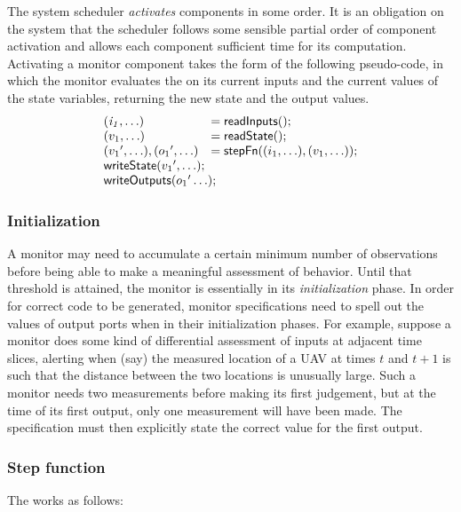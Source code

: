 The system scheduler \emph{activates} components in some order. It is
an obligation on the system that the scheduler follows some sensible
partial order of component activation and allows each component
sufficient time for its computation.  Activating a monitor component
takes the form of the following pseudo-code, in which the monitor
evaluates the  on its current inputs and the current
values of the state variables, returning the new state and the output
values.
\[
\begin{array}{ll}
 \mathit{(i_1,\ldots)} & = \konst{readInputs}(); \\
 (v_1,\ldots) & = \konst{readState}() ; \\
 ({v_1}',\ldots), ({o_1}',\ldots) & = \konst{stepFn} ((i_1,\ldots),(v_1,\ldots)) ; \\
 \multicolumn{2}{l}{\konst{writeState}({v_1}',\ldots);} \\
 \multicolumn{2}{l}{\konst{writeOutputs}({o_1}'\ldots);} \\
\end{array}
\]

\subsubsection{Initialization}

A monitor may need to accumulate a certain minimum number of
observations before being able to make a meaningful assessment of
behavior. Until that threshold is attained, the monitor is essentially
in its \emph{initialization} phase. In order for correct code to
be generated, monitor specifications need to spell out the values of
output ports when in their initialization phases. For example, suppose a
monitor does some kind of differential assessment of inputs at
adjacent time slices, alerting when (say) the measured location of a
UAV at times $t$ and $t+1$ is such that the distance between the two
locations is unusually large. Such a monitor needs two measurements
before making its first judgement, but at the time of its first
output, only one measurement will have been made. The specification
must then explicitly state the correct value for the first output.

\subsubsection{Step function}

The  works as follows:


